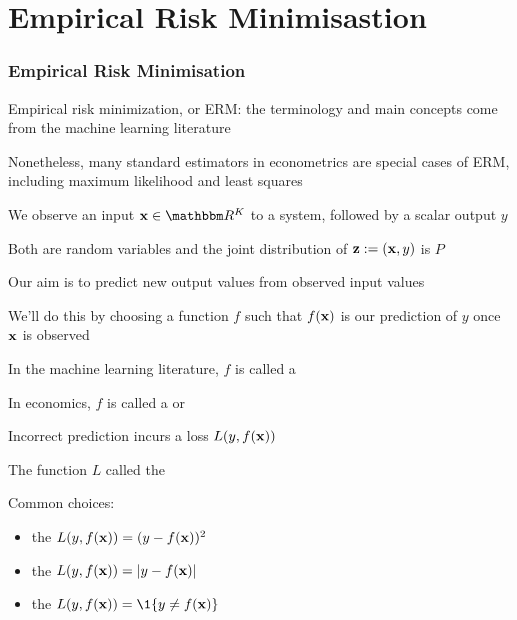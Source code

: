 \section{Empirical Risk Minimisastion}

\begin{frame}\frametitle{Empirical Risk Minimisation}

    \vspace{2em}
    Empirical risk minimization,  or ERM: the terminology and main
    concepts come from the machine learning literature
    
    \vspace{.7em}
    Nonetheless, many
    standard estimators in econometrics are special cases of ERM, including
    maximum likelihood and least squares
    
\end{frame}

\begin{frame}

    \vspace{2em}
    We observe an input $\boldx \in \RR^K$ to
    a system, followed by a scalar output $y$
    
    Both are random variables
    and the joint distribution of ${\mathbf z} := ({\mathbf x}, y)$ is $P$
    
    Our aim is to predict new output values from observed input values
    
    We'll do this
    by choosing a function $f$ such that $f({\mathbf x})$ is our prediction of $y$ once
    ${\mathbf x}$ is observed
    
    \vspace{.7em}
    In the machine learning literature, $f$ is called a
    
    In economics, $f$ is called a  or
    
\end{frame}

\begin{frame}

    \vspace{2em}
    Incorrect prediction incurs a loss $L(y,
    f({\mathbf x}))$
    
    \vspace{.7em}
    The function $L$  called the 

    Common
    choices:
    
    \begin{itemize}
        \item the  $L(y, f({\mathbf x})) = (y -
            f({\mathbf x}))^2$
        \item the  $L(y, f({\mathbf x})) = |y -
            f({\mathbf x})|$
        \item the  $L(y, f(\boldx)) = \1\{y \not=
            f(\boldx)\}$
    \end{itemize}

\end{frame}

